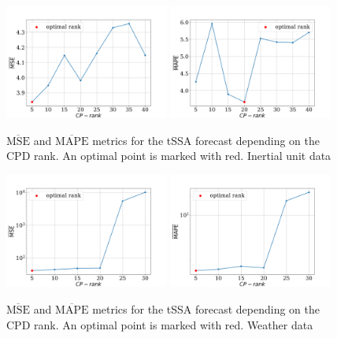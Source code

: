 \documentclass[referee, pdflatex, sn-mathphys-num]{sn-jnl}
\theoremstyle{definition}
\theoremstyle{plain}
\begin{document}
\begin{appendices}
		\begin{figure}[h]
			\centering
			\includegraphics[width=0.48\textwidth, keepaspectratio]{pred_MSE_rank_motion.png}
			\includegraphics[width=0.48\textwidth, keepaspectratio]{pred_MAPE_rank_motion.png}
			\caption{$ \overline{\text{MSE}} $ and $ \overline{\text{MAPE}} $ metrics for the tSSA forecast depending on the CPD rank. An optimal point is marked with red. Inertial unit data}\label{fig:mse_mape_motion}
		\end{figure}
		
		\begin{figure}[h]
			\centering
			\includegraphics[width=0.48\textwidth, keepaspectratio]{pred_MSE_rank_weather.png}
			\includegraphics[width=0.48\textwidth, keepaspectratio]{pred_MAPE_rank_weather.png}
			\caption{$ \overline{\text{MSE}} $ and $ \overline{\text{MAPE}} $ metrics for the tSSA forecast depending on the CPD rank. An optimal point is marked with red. Weather data}\label{fig:mse_mape_weather}
		\end{figure}
		

\end{appendices}
\end{document}
